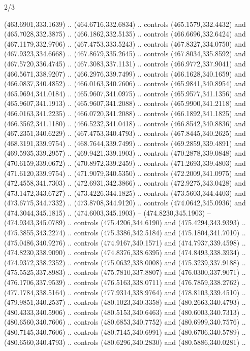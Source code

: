 \begin{flagdescription}{2/3}
\begin{scope}[xshift=0.5\flaglength,yshift=0.5\flagwidth,scale=\flagwidth/495.65]
\begin{scope}[y=0.8pt, x=0.8pt, yscale=-1,shift={(-463.76,-309.78)}]
  (463.6901,333.1639) .. (464.6716,332.6834) .. controls (465.1579,332.4432) and
  (465.7028,332.3875) .. (466.1862,332.5135) .. controls (466.6696,332.6424) and
  (467.1179,332.9706) .. (467.4753,333.5243) .. controls (467.8327,334.0750) and
  (467.9323,334.6668) .. (467.8679,335.2645) .. controls (467.8034,335.8592) and
  (467.5720,336.4745) .. (467.3083,337.1131) .. controls (466.9772,337.9041) and
  (466.5671,338.9207) .. (466.2976,339.7499) .. controls (466.1628,340.1659) and
  (466.0837,340.4852) .. (466.0163,340.7606) .. controls (465.9841,340.8954) and
  (465.9694,341.0184) .. (465.9607,341.0975) .. controls (465.9577,341.1356) and
  (465.9607,341.1913) .. (465.9607,341.2088) .. controls (465.9900,341.2118) and
  (466.0163,341.2235) .. (466.0720,341.2088) .. controls (466.1892,341.1825) and
  (466.3562,341.1180) .. (466.5232,341.0418) .. controls (466.8542,340.8836) and
  (467.2351,340.6229) .. (467.4753,340.4793) .. controls (467.8445,340.2625) and
  (468.3191,339.9754) .. (468.7644,339.7499) .. controls (469.2859,339.4891) and
  (469.5935,339.2957) .. (469.9421,339.1903) .. controls (470.2878,339.0848) and
  (470.6159,339.0672) .. (470.8972,339.2459) .. controls (471.2693,339.4803) and
  (471.6120,339.9754) .. (471.9079,340.5350) .. controls (472.2009,341.0975) and
  (472.4558,341.7303) .. (472.6931,342.3866) .. controls (472.9275,343.0428) and
  (473.1472,343.6727) .. (473.4226,344.1825) .. controls (473.5603,344.4403) and
  (473.6775,344.7332) .. (473.8708,344.9120) .. controls (474.0642,345.0936) and
  (474.3044,345.1815) .. (474.6003,345.1903) -- (474.8230,345.1903) --
  (474.9343,345.0789) .. controls (475.4206,344.6190) and (475.4294,343.9393) ..
  (475.3855,343.2274) .. controls (475.3386,342.5184) and (475.1804,341.7010) ..
  (475.0486,340.9276) .. controls (474.9167,340.1571) and (474.7937,339.4598) ..
  (474.8230,338.9090) .. controls (474.8376,338.6395) and (474.8493,338.3934) ..
  (474.9372,338.2352) .. controls (475.0632,338.0008) and (475.3239,337.9188) ..
  (475.5525,337.8983) .. controls (475.7810,337.8807) and (476.0300,337.9071) ..
  (476.1706,337.9539) .. controls (476.5163,338.0711) and (476.7859,338.2762) ..
  (477.1784,338.5164) .. controls (477.9314,338.9764) and (478.8103,339.4510) ..
  (479.9851,340.2537) .. controls (480.1023,340.3358) and (480.2663,340.4793) ..
  (480.4333,340.5906) .. controls (480.5153,340.6463) and (480.6003,340.7313) ..
  (480.6560,340.7606) .. controls (480.6853,340.7752) and (480.6999,340.7576) ..
  (480.7145,340.7606) .. controls (480.7145,340.6991) and (480.6706,340.5789) ..
  (480.6560,340.4793) .. controls (480.6296,340.2830) and (480.5886,340.0281) ..

\end{scope}
\end{scope}
\end{flagdescription}
